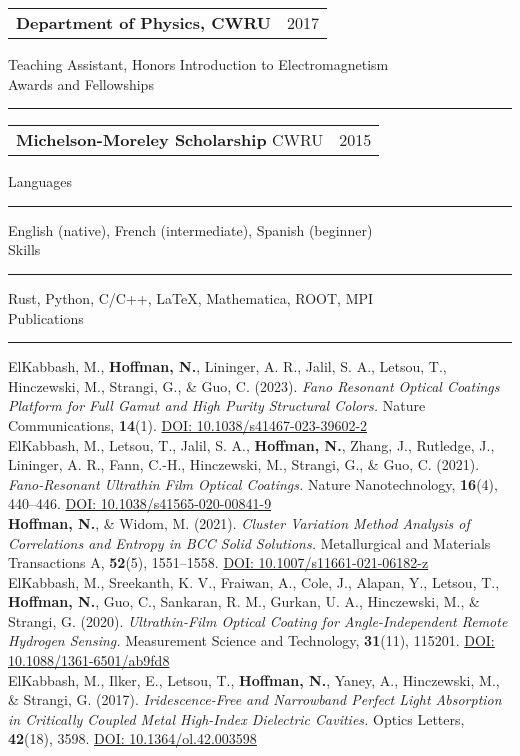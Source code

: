 \documentclass[letterpaper,11pt,oneside]{article}
\makeatletter
\newcommand{\datedentry}[2]{%
  \begin{tabular*}{\textwidth}{@{\extracolsep{\fill}} p{0.75\textwidth} r}
    #1 & #2 \\
  \end{tabular*}
}
\newcommand{\sectionheader}[1]{%
{\Large{#1}}
\vspace{2ex}
\hrule
\vspace{2ex}
}
\makeatother
\begin{document}
\datedentry{\textbf{Department of Physics, CWRU}}{2017\textendash 2019}
Teaching Assistant, Honors Introduction to Electromagnetism\\

\sectionheader{Awards and Fellowships}
\datedentry{\textbf{Michelson-Moreley Scholarship}
CWRU}{2015\textendash 2019}

\newpage

\sectionheader{Languages}
English (native), French (intermediate), Spanish (beginner)\\

\sectionheader{Skills}
Rust, Python, C/C++, \LaTeX, Mathematica, ROOT, MPI\\

\sectionheader{Publications}
ElKabbash, M., \textbf{Hoffman, N.}, Lininger, A. R., Jalil, S. A., Letsou, T., Hinczewski, M., Strangi, G., \& Guo, C. (2023). \textit{Fano Resonant Optical Coatings Platform for Full Gamut and High Purity Structural Colors.} Nature Communications, \textbf{14}(1). \href{https://doi.org/10.1038/s41467-023-39602-2}{DOI: 10.1038/s41467-023-39602-2}\\

ElKabbash, M., Letsou, T., Jalil, S. A., \textbf{Hoffman, N.}, Zhang, J., Rutledge, J., Lininger, A. R., Fann, C.-H., Hinczewski, M., Strangi, G., \& Guo, C. (2021). \textit{Fano-Resonant Ultrathin Film Optical Coatings.} Nature Nanotechnology, \textbf{16}(4), 440–446. \href{https://doi.org/10.1038/s41565-020-00841-9}{DOI: 10.1038/s41565-020-00841-9}\\

\textbf{Hoffman, N.}, \& Widom, M. (2021). \textit{Cluster Variation Method Analysis of Correlations and Entropy in BCC Solid Solutions.} Metallurgical and Materials Transactions A, \textbf{52}(5), 1551–1558. \href{https://doi.org/10.1007/s11661-021-06182-z}{DOI: 10.1007/s11661-021-06182-z}\\

ElKabbash, M., Sreekanth, K. V., Fraiwan, A., Cole, J., Alapan, Y., Letsou, T., \textbf{Hoffman, N.}, Guo, C., Sankaran, R. M., Gurkan, U. A., Hinczewski, M., \& Strangi, G. (2020). \textit{Ultrathin-Film Optical Coating for Angle-Independent Remote Hydrogen Sensing.} Measurement Science and Technology, \textbf{31}(11), 115201. \href{https://doi.org/10.1088/1361-6501/ab9fd8}{DOI: 10.1088/1361-6501/ab9fd8}\\

ElKabbash, M., Ilker, E., Letsou, T., \textbf{Hoffman, N.}, Yaney, A., Hinczewski, M., \& Strangi, G. (2017). \textit{Iridescence-Free and Narrowband Perfect Light Absorption in Critically Coupled Metal High-Index Dielectric Cavities.} Optics Letters, \textbf{42}(18), 3598. \href{https://doi.org/10.1364/ol.42.003598}{DOI: 10.1364/ol.42.003598}\\
\end{document}
